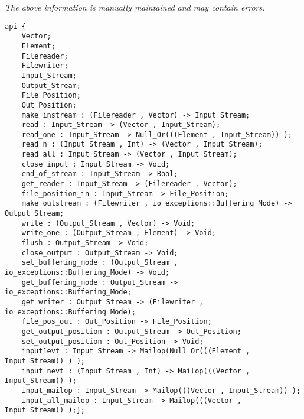 \label{api:Winix\_Pure\_File\_For\_Os}

{\tiny \it The above information is manually maintained and may contain errors.}
\begin{verbatim}
api {
    Vector;
    Element;
    Filereader;
    Filewriter;
    Input_Stream;
    Output_Stream;
    File_Position;
    Out_Position;
    make_instream : (Filereader , Vector) -> Input_Stream;
    read : Input_Stream -> (Vector , Input_Stream);
    read_one : Input_Stream -> Null_Or(((Element , Input_Stream)) );
    read_n : (Input_Stream , Int) -> (Vector , Input_Stream);
    read_all : Input_Stream -> (Vector , Input_Stream);
    close_input : Input_Stream -> Void;
    end_of_stream : Input_Stream -> Bool;
    get_reader : Input_Stream -> (Filereader , Vector);
    file_position_in : Input_Stream -> File_Position;
    make_outstream : (Filewriter , io_exceptions::Buffering_Mode) -> Output_Stream;
    write : (Output_Stream , Vector) -> Void;
    write_one : (Output_Stream , Element) -> Void;
    flush : Output_Stream -> Void;
    close_output : Output_Stream -> Void;
    set_buffering_mode : (Output_Stream , io_exceptions::Buffering_Mode) -> Void;
    get_buffering_mode : Output_Stream -> io_exceptions::Buffering_Mode;
    get_writer : Output_Stream -> (Filewriter , io_exceptions::Buffering_Mode);
    file_pos_out : Out_Position -> File_Position;
    get_output_position : Output_Stream -> Out_Position;
    set_output_position : Out_Position -> Void;
    input1evt : Input_Stream -> Mailop(Null_Or(((Element , Input_Stream)) ) );
    input_nevt : (Input_Stream , Int) -> Mailop(((Vector , Input_Stream)) );
    input_mailop : Input_Stream -> Mailop(((Vector , Input_Stream)) );
    input_all_mailop : Input_Stream -> Mailop(((Vector , Input_Stream)) );};
\end{verbatim}
